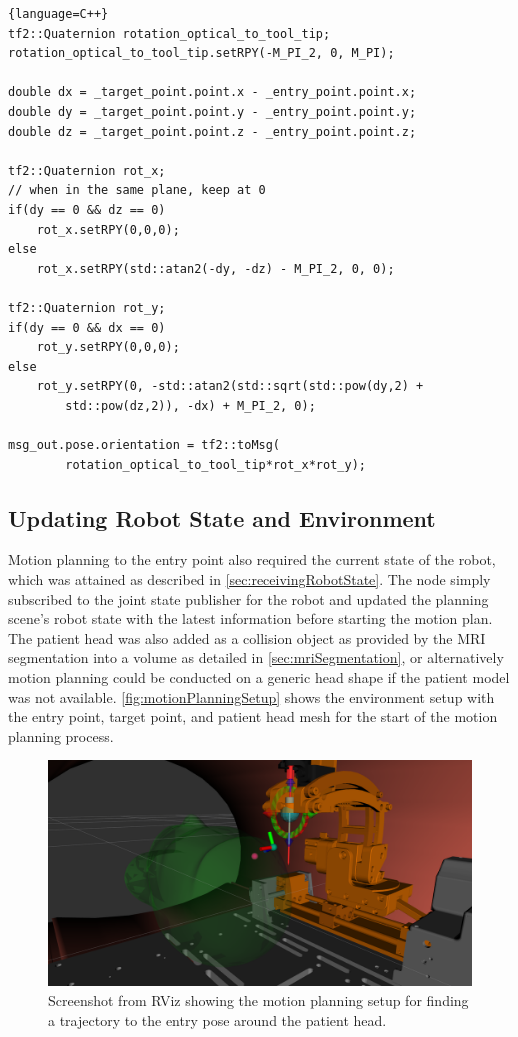 \documentclass[12pt]{report}
\begin{document}
\singlespacing
\begin{lstlisting}{language=C++}
tf2::Quaternion rotation_optical_to_tool_tip;
rotation_optical_to_tool_tip.setRPY(-M_PI_2, 0, M_PI);

double dx = _target_point.point.x - _entry_point.point.x;
double dy = _target_point.point.y - _entry_point.point.y;
double dz = _target_point.point.z - _entry_point.point.z;

tf2::Quaternion rot_x;
// when in the same plane, keep at 0
if(dy == 0 && dz == 0)
	rot_x.setRPY(0,0,0);
else
	rot_x.setRPY(std::atan2(-dy, -dz) - M_PI_2, 0, 0);

tf2::Quaternion rot_y;
if(dy == 0 && dx == 0)
	rot_y.setRPY(0,0,0);
else
	rot_y.setRPY(0, -std::atan2(std::sqrt(std::pow(dy,2) + 
		std::pow(dz,2)), -dx) + M_PI_2, 0);

msg_out.pose.orientation = tf2::toMsg(
		rotation_optical_to_tool_tip*rot_x*rot_y);
\end{lstlisting}
\doublespacing

\subsection{Updating Robot State and Environment}
Motion planning to the entry point also required the current state of the robot, which was attained as described in \autoref{sec:receivingRobotState}. The node simply subscribed to the joint state publisher for the robot and updated the planning scene's robot state with the latest information before starting the motion plan. The patient head was also added as a collision object as provided by the MRI segmentation into a volume as detailed in \autoref{sec:mriSegmentation}, or alternatively motion planning could be conducted on a generic head shape if the patient model was not available. \autoref{fig:motionPlanningSetup} shows the environment setup with the entry point, target point, and patient head mesh for the start of the motion planning process.

\begin{figure}[thpb]
	\centering
	\includegraphics[width=\textwidth]{images/motion_planning_setup_2.png}
    \caption{Screenshot from RViz showing the motion planning setup for finding a trajectory to the entry pose around the patient head.}
    \label{fig:motionPlanningSetup}
\end{figure}
\end{document}
